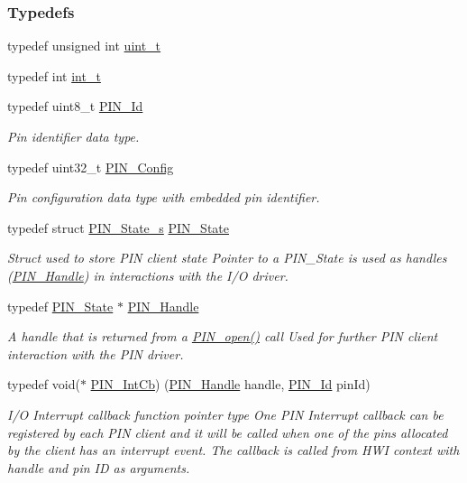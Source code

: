 \subsubsection*{Typedefs}
\begin{DoxyCompactItemize}
\item 
typedef unsigned int \hyperlink{_p_i_n_8h_a12a1e9b3ce141648783a82445d02b58d}{uint\+\_\+t}
\item 
typedef int \hyperlink{_p_i_n_8h_ab6fd6105e64ed14a0c9281326f05e623}{int\+\_\+t}
\item 
typedef uint8\+\_\+t \hyperlink{_p_i_n_8h_a9ae8197f460bb76ea09a84f47d09921f}{P\+I\+N\+\_\+\+Id}
\begin{DoxyCompactList}\small\item\em Pin identifier data type. \end{DoxyCompactList}\item 
typedef uint32\+\_\+t \hyperlink{_p_i_n_8h_ae427b7d2925f9b0f3145e455cfdb5841}{P\+I\+N\+\_\+\+Config}
\begin{DoxyCompactList}\small\item\em Pin configuration data type with embedded pin identifier. \end{DoxyCompactList}\item 
typedef struct \hyperlink{struct_p_i_n___state__s}{P\+I\+N\+\_\+\+State\+\_\+s} \hyperlink{_p_i_n_8h_a36ef69d50df6baa6973482669c24a522}{P\+I\+N\+\_\+\+State}
\begin{DoxyCompactList}\small\item\em Struct used to store P\+I\+N client state Pointer to a P\+I\+N\+\_\+\+State is used as handles (\hyperlink{_p_i_n_8h_afb2de52b054638f63c39df1f30a0d88d}{P\+I\+N\+\_\+\+Handle}) in interactions with the I/\+O driver. \end{DoxyCompactList}\item 
typedef \hyperlink{_p_i_n_8h_a36ef69d50df6baa6973482669c24a522}{P\+I\+N\+\_\+\+State} $\ast$ \hyperlink{_p_i_n_8h_afb2de52b054638f63c39df1f30a0d88d}{P\+I\+N\+\_\+\+Handle}
\begin{DoxyCompactList}\small\item\em A handle that is returned from a \hyperlink{_p_i_n_8h_a731c5bb641ffeb064579432adfc8dba0}{P\+I\+N\+\_\+open()} call Used for further P\+I\+N client interaction with the P\+I\+N driver. \end{DoxyCompactList}\item 
typedef void($\ast$ \hyperlink{_p_i_n_8h_a289cbfdcb1e23ade7c3b0f5fc3b2d695}{P\+I\+N\+\_\+\+Int\+Cb}) (\hyperlink{_p_i_n_8h_afb2de52b054638f63c39df1f30a0d88d}{P\+I\+N\+\_\+\+Handle} handle, \hyperlink{_p_i_n_8h_a9ae8197f460bb76ea09a84f47d09921f}{P\+I\+N\+\_\+\+Id} pin\+Id)
\begin{DoxyCompactList}\small\item\em I/\+O Interrupt callback function pointer type One P\+I\+N Interrupt callback can be registered by each P\+I\+N client and it will be called when one of the pins allocated by the client has an interrupt event. The callback is called from H\+W\+I context with handle and pin I\+D as arguments. \end{DoxyCompactList}\end{DoxyCompactItemize}

